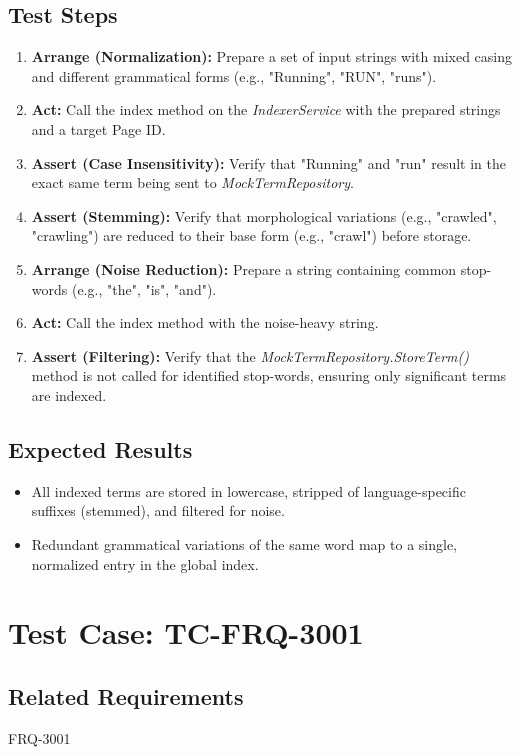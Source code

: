 \documentclass{article}
\begin{document}
\subsection*{Test Steps}
\begin{enumerate}
  \item \textbf{Arrange (Normalization):} Prepare a set of input strings with mixed casing and different grammatical forms (e.g., "Running", "RUN", "runs").
  \item \textbf{Act:} Call the index method on the \textit{IndexerService} with the prepared strings and a target Page ID.
  \item \textbf{Assert (Case Insensitivity):} Verify that "Running" and "run" result in the exact same term being sent to \textit{MockTermRepository}.
  \item \textbf{Assert (Stemming):} Verify that morphological variations (e.g., "crawled", "crawling") are reduced to their base form (e.g., "crawl") before storage.
  \item \textbf{Arrange (Noise Reduction):} Prepare a string containing common stop-words (e.g., "the", "is", "and").
  \item \textbf{Act:} Call the index method with the noise-heavy string.
  \item \textbf{Assert (Filtering):} Verify that the \textit{MockTermRepository.StoreTerm()} method is not called for identified stop-words, ensuring only significant terms are indexed.
\end{enumerate}

\subsection*{Expected Results}
\begin{itemize}
  \item All indexed terms are stored in lowercase, stripped of language-specific suffixes (stemmed), and filtered for noise.
  \item Redundant grammatical variations of the same word map to a single, normalized entry in the global index.
\end{itemize}

\section{Test Case: TC-FRQ-3001}

\subsection*{Related Requirements}
FRQ-3001
\end{document}
